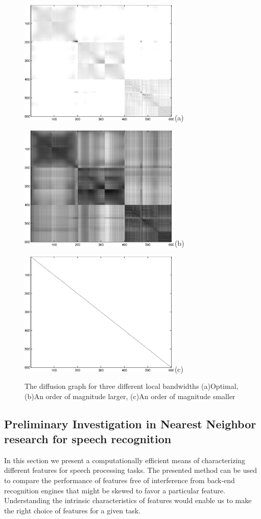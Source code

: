 \documentclass[12pt,letterpaper,doublespaced,ETD,dvips,proposal]{gtthesis}
\begin{document}
\begin{Body}
\begin{figure}[!htb]
 \centerline{\includegraphics[height=6cm]{fig4b.eps}(a)}
\centerline{\includegraphics[height=6cm]{fig4d.eps}(b)}
\centerline{\includegraphics[height=6cm]{fig4f.eps}(c)}
 \caption{The diffusion graph for three different local bandwidths
(a)Optimal, (b)An order of magnitude larger, (c)An order of
magnitude smaller}
  \label{fig5}
\end{figure}


\subsection{Preliminary Investigation in Nearest Neighbor research for speech recognition}

In this section we present a computationally efficient means of
characterizing different features for speech processing tasks. The
presented method can be used to compare the performance of features
free of interference from back-end recognition engines that might be
skewed to favor a particular feature. Understanding the intrinsic
characteristics of features would enable us to make the right choice
of features for a given task.


\end{Body}
\end{document}
